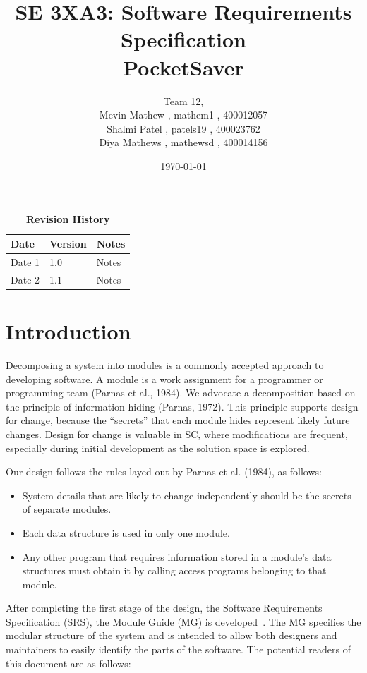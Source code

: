 \documentclass[12pt, titlepage]{article}
\title{SE 3XA3: Software Requirements Specification\\PocketSaver}
\author{Team 12, 
		\\ Mevin Mathew , mathem1 , 400012057
		\\ Shalmi Patel , patels19 , 400023762
		\\ Diya Mathews , mathewsd , 400014156
}
\date{\today}
\begin{document}
\maketitle

\tableofcontents
\listoftables
\listoffigures

\begin{table}[bp]
\caption{\bf Revision History}
\begin{tabularx}{\textwidth}{p{3cm}p{2cm}X}
\toprule {\bf Date} & {\bf Version} & {\bf Notes}\\
\midrule
Date 1 & 1.0 & Notes\\
Date 2 & 1.1 & Notes\\
\bottomrule
\end{tabularx}
\end{table}

\newpage


\section{Introduction}

Decomposing a system into modules is a commonly accepted approach to developing
software.  A module is a work assignment for a programmer or programming
team (Parnas et al., 1984).  We advocate a decomposition
based on the principle of information hiding (Parnas, 1972).  This
principle supports design for change, because the ``secrets'' that each module
hides represent likely future changes.  Design for change is valuable in SC,
where modifications are frequent, especially during initial development as the
solution space is explored.  

Our design follows the rules layed out by Parnas et al. (1984), as follows:
\begin{itemize}
\item System details that are likely to change independently should be the
  secrets of separate modules.
\item Each data structure is used in only one module.
\item Any other program that requires information stored in a module's data
  structures must obtain it by calling access programs belonging to that module.
\end{itemize}

After completing the first stage of the design, the Software Requirements
Specification (SRS), the Module Guide (MG) is developed~\citep{ParnasEtAl1984}. The MG
specifies the modular structure of the system and is intended to allow both
designers and maintainers to easily identify the parts of the software.  The
potential readers of this document are as follows:
\end{document}
